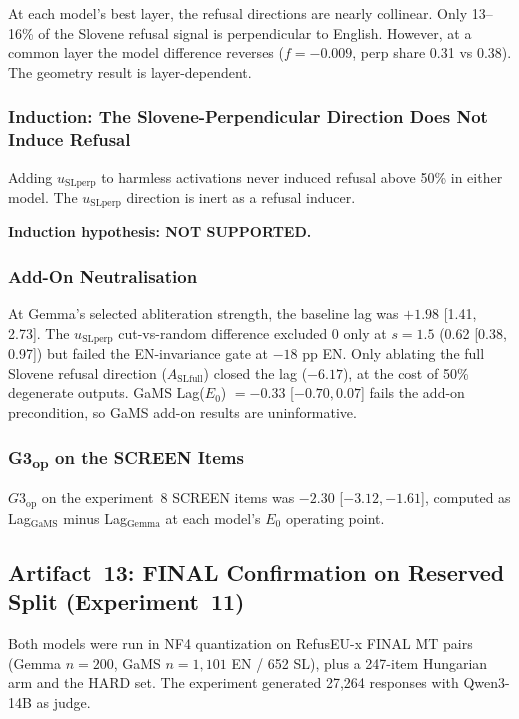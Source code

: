 \documentclass[11pt,letterpaper]{article}
\begin{document}
At each model's best layer, the refusal directions are nearly collinear. Only 13--16\% of the Slovene refusal signal is perpendicular to English. However, at a common layer the model difference reverses ($f = -0.009$, perp share 0.31 vs 0.38). The geometry result is layer-dependent.

\subsubsection{Induction: The Slovene-Perpendicular Direction Does Not Induce Refusal}

Adding $u_{\text{SLperp}}$ to harmless activations never induced refusal above 50\% in either model. The $u_{\text{SLperp}}$ direction is inert as a refusal inducer.

\textbf{Induction hypothesis: NOT SUPPORTED.}

\subsubsection{Add-On Neutralisation}

At Gemma's selected abliteration strength, the baseline lag was $+1.98$ [1.41, 2.73]. The $u_{\text{SLperp}}$ cut-vs-random difference excluded 0 only at $s=1.5$ (0.62 [0.38, 0.97]) but failed the EN-invariance gate at $-18$ pp EN. Only ablating the full Slovene refusal direction ($A_{\text{SLfull}}$) closed the lag ($-6.17$), at the cost of 50\% degenerate outputs. GaMS Lag($E_0$) $= -0.33$ [$-0.70, 0.07$] fails the add-on precondition, so GaMS add-on results are uninformative.

\subsubsection{G3\textsubscript{op} on the SCREEN Items}

$G3_{\text{op}}$ on the experiment~8 SCREEN items was $-2.30$ [$-3.12, -1.61$], computed as Lag$_{\text{GaMS}}$ minus Lag$_{\text{Gemma}}$ at each model's $E_0$ operating point.


\subsection{Artifact~13: FINAL Confirmation on Reserved Split (Experiment~11)}
\label{gen_art_experiment_11}

Both models were run in NF4 quantization on RefusEU-x FINAL MT pairs (Gemma $n = 200$, GaMS $n = 1{,}101$ EN / 652 SL), plus a 247-item Hungarian arm and the HARD set. The experiment generated 27,264 responses with Qwen3-14B as judge.
\end{document}
